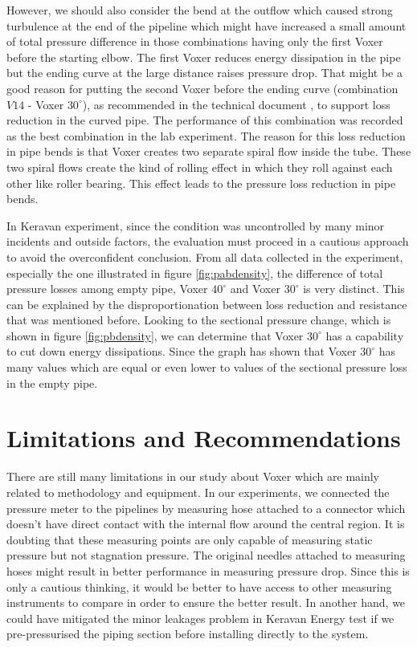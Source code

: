 However, we should also consider the bend at the outflow which caused strong turbulence at the end of the pipeline which might have increased a small amount of total pressure difference in those combinations having only the first Voxer before the starting elbow. The first Voxer reduces energy dissipation in the pipe but the ending curve at the large distance raises pressure drop. That might be a good reason for putting the second Voxer before the ending curve (combination $V14$ - Voxer $30^{\circ}$), as recommended in the technical document \cite{voxer:article}, to support loss reduction in the curved pipe. The performance of this combination was recorded as the best combination in the lab experiment. The reason for this loss reduction in pipe bends is that Voxer creates two separate spiral flow inside the tube. These two spiral flows create the kind of rolling effect in which they roll against each other like roller bearing. This effect leads to the pressure loss reduction in pipe bends.

In Keravan experiment, since the condition was uncontrolled by many minor incidents and outside factors, the evaluation must proceed in a cautious approach to avoid the overconfident conclusion. From all data collected in the experiment, especially the one illustrated in figure \vref{fig:pabdensity}, the difference of total pressure losses among empty pipe, Voxer $40^{\circ}$ and Voxer $30^{\circ}$ is very distinct. This can be explained by the disproportionation between loss reduction and resistance that was mentioned before. Looking to the sectional pressure change, which is shown in figure \vref{fig:pbdensity}, we can determine that Voxer $30^{\circ}$ has a capability to cut down energy dissipations. Since the graph has shown that Voxer $30^{\circ}$ has many values which are equal or even lower to values of the sectional pressure loss in the empty pipe.

\section{Limitations and Recommendations}

There are still many limitations in our study about Voxer which are mainly related to methodology and equipment. In our experiments, we connected the pressure meter to the pipelines by measuring hose attached to a connector which doesn't have direct contact with the internal flow around the central region. It is doubting that these measuring points are only capable of measuring static pressure but not stagnation pressure. The original needles \cite{danfoss:web} attached to measuring hoses might result in better performance in measuring pressure drop. Since this is only a cautious thinking, it would be better to have access to other measuring instruments to compare in order to ensure the better result. In another hand, we could have mitigated the minor leakages problem in Keravan Energy test if we pre-pressurised the piping section before installing directly to the system. 

